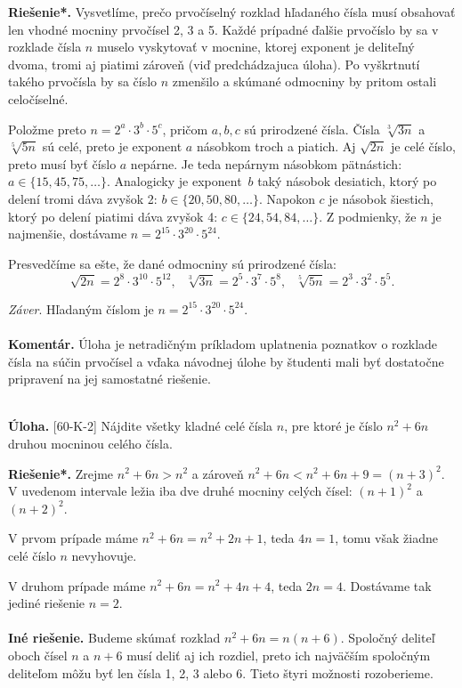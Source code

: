\documentclass[11pt,a4paper,oneside,final]{book}
\newcommand{\kom}{\textbf{Komentár.} }
\newcommand{\ul}{\textbf{Úloha.} }
\newcommand{\rieh}{\textbf{Riešenie*.} }
\begin{document}
\rieh Vysvetlíme, prečo prvočíselný rozklad hľadaného čísla musí obsahovať len vhodné mocniny prvočísel 2, 3 a 5. Každé prípadné ďalšie prvočíslo by sa v rozklade čísla $n$ muselo vyskytovať v mocnine, ktorej exponent je deliteľný dvoma, tromi aj piatimi zároveň (viď predchádzajuca úloha). Po vyškrtnutí takého prvočísla by sa číslo $n$ zmenšilo a skúmané odmocniny by pritom ostali celočíselné.

Položme preto $n = 2^a \cdot 3^b \cdot 5^c$, pričom $a, b, c$ sú prirodzené čísla. Čísla $\sqrt[3]{3n}$ a $\sqrt[5]{5n}$ sú celé, preto je exponent $a$ násobkom troch a piatich. Aj $\sqrt{2n}$ je celé číslo, preto musí byť číslo $a$ nepárne. Je teda nepárnym násobkom pätnástich: $a \in \{15, 45, 75, \ldots\}$. Analogicky je exponent~$b$ taký násobok desiatich, ktorý po delení tromi dáva zvyšok 2: $b \in \{20, 50, 80, \ldots\}$. Napokon $c$ je násobok šiestich, ktorý po delení piatimi dáva zvyšok 4: $c \in \{24, 54, 84, \ldots\}$. Z podmienky, že $n$ je najmenšie, dostávame $n = 2^{15} \cdot3^{20} \cdot 5^{24}$.

Presvedčíme sa ešte, že dané odmocniny sú prirodzené čísla:
$$\sqrt{2n} = 2^8 \cdot 3^{10} \cdot 5^{12},\ \ \ \sqrt[3]{3n} = 2^5 \cdot 3^7 \cdot 5^8, \ \ \ \sqrt[5]{5n} = 2^3 \cdot 3^2 \cdot5^5.$$

\textit{Záver}. Hľadaným číslom je $n = 2^{15} \cdot 3^{20} \cdot 5^{24}$.\\
\\
\kom Úloha je netradičným príkladom uplatnenia poznatkov o rozklade čísla na súčin prvočísel a vďaka návodnej úlohe by študenti mali byť dostatočne pripravení na jej samostatné riešenie.\\
\\
\begin{tcolorbox}[breakable,notitle,boxrule=0pt,colback=light-gray,colframe=light-gray]\ul [60-K-2]
Nájdite všetky kladné celé čísla $n$, pre ktoré je číslo $n^2 + 6n$ druhou mocninou celého čísla.

\end{tcolorbox}

\rieh Zrejme $n^2 +6n > n^2$ a zároveň $n^2 +6n < n^2 +6n+9 = (n+3)^2$. V uvedenom intervale ležia iba dve druhé mocniny celých čísel: $(n + 1)^2$ a $(n + 2)^2$.

V prvom prípade máme $n^2 + 6n = n^2 + 2n + 1$, teda $4n = 1$, tomu však žiadne celé číslo $n$ nevyhovuje.

V druhom prípade máme $n^2 + 6n = n^2 + 4n + 4$, teda $2n = 4$. Dostávame tak jediné riešenie $n = 2$.\\
\\
\textbf{Iné riešenie.} Budeme skúmať rozklad $n^2 + 6n = n(n+ 6)$. Spoločný deliteľ oboch čísel $n$ a $n + 6$ musí deliť aj ich rozdiel, preto ich najväčším spoločným deliteľom môžu byť len čísla 1, 2, 3 alebo 6. Tieto štyri možnosti rozoberieme.
\end{document}
